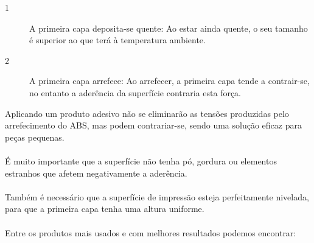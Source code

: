\documentclass[11pt,a4paper]{article}
\begin{document}
\begin{description}
\item[1] A primeira capa deposita-se quente: Ao estar ainda quente, o seu tamanho é superior ao que terá à temperatura ambiente.
\item[2] A primeira capa arrefece: Ao arrefecer, a primeira capa tende a contrair-se, no entanto a aderência da superfície contraria esta força.
\end{description}
Aplicando um produto adesivo não se eliminarão as tensões produzidas pelo arrefecimento do ABS, mas podem contrariar-se, sendo uma solução eficaz para peças pequenas.
\\\\
É muito importante que a superfície não tenha pó, gordura ou elementos estranhos que afetem negativamente a aderência.
\\\\
Também é necessário que a superfície de impressão esteja perfeitamente nivelada, para que a primeira capa tenha uma altura uniforme.
\\\\
Entre os produtos mais usados e com melhores resultados podemos encontrar:
\end{document}
